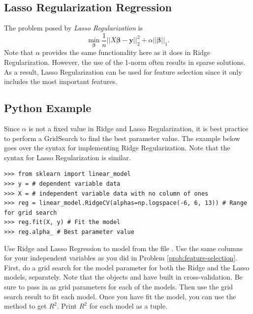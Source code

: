 \subsection*{Lasso Regularization Regression}
The problem posed by \textit{Lasso Regularization} is \[ \min_{\boldsymbol\beta} \frac{1}{n} \vert\vert X\boldsymbol\beta - \boldsymbol y \vert\vert_2^2 + \alpha \vert\vert \boldsymbol\beta \vert\vert_1. \]
Note that $\alpha$ provides the same functionality here as it does in Ridge Regularization. However, the use of the 1-norm often results in sparse solutions. 
As a result, Lasso Regularization can be used for feature selection since it only includes the most important features.

\subsection*{Python Example}
Since $\alpha$ is not a fixed value in Ridge and Lasso Regularization, it is best practice to perform a GridSearch to find the best parameter value. 
The example below goes over the syntax for implementing Ridge Regularization. Note that the syntax for Lasso Regularization is similar.

\begin{lstlisting}
>>> from sklearn import linear_model
>>> y = # dependent variable data
>>> X = # independent variable data with no column of ones
>>> reg = linear_model.RidgeCV(alphas=np.logspace(-6, 6, 13)) # Range for grid search 
>>> reg.fit(X, y) # Fit the model
>>> reg.alpha_ # Best parameter value 
\end{lstlisting} 


\begin{problem}
Use Ridge and Lasso Regression to model  from the file .
Use the same columns for your independent variables as you did in Problem \ref{prob:feature-selection}.
First, do a grid search for the model parameter for both the Ridge and the Lasso models, separately.
Note that the objects  and  have built in cross-validation.
Be sure to pass in  as grid parameters for each of the models. 
Then use the grid search result to fit each model.
Once you have fit the model, you can use the  method to get $R^2$. 
Print $R^2$ for each model as a tuple. 
\end{problem}






